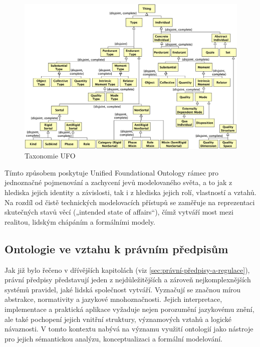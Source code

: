 \begin{figure}[H]
  \centering
  \includegraphics[width=\textwidth]{images/ufo_taxonomy.png}
  \caption{Taxonomie UFO \cite{Guizzardi2022}}
  \label{fig:ufo_taxonomy}
\end{figure}

Tímto způsobem poskytuje Unified Foundational Ontology rámec pro jednoznačné pojmenování a zachycení jevů modelovaného světa, a to jak z hlediska jejich identity a závislosti, tak i z hlediska jejich rolí, vlastností a vztahů. Na rozdíl od čistě technických modelovacích přístupů se zaměřuje na reprezentaci skutečných stavů věcí („intended state of affairs“), čímž vytváří most mezi realitou, lidským chápáním a formálními modely. \cite{Guizzardi2022}


\subsection{Ontologie ve vztahu k právním předpisům}
\label{sec:ontologie-ve-vztahu-k-právním-předpisům}

Jak již bylo řečeno v dřívějších kapitolách (viz \ref{sec:právní-předpisy-a-regulace}), právní předpisy představují jeden z nejdůležitějších a zároveň nejkomplexnějších systémů pravidel, jaké lidská společnost vytváří. Vyznačují se značnou mírou abstrakce, normativity a jazykové mnohoznačnosti. Jejich interpretace, implementace a praktická aplikace vyžaduje nejen porozumění jazykovému znění, ale také pochopení jejich vnitřní struktury, významových vztahů a logické návaznosti. V tomto kontextu nabývá na významu využití ontologií jako nástroje pro jejich sémantickou analýzu, konceptualizaci a formální modelování.\cite{VanEngers2008}

